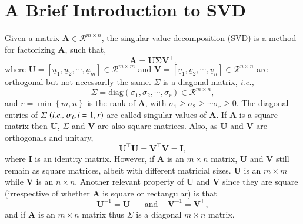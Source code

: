 \documentclass[preprint,12pt]{elsarticle}
\newcommand{\ie}{{\it i.e., }}
\begin{document}
\section{\\A Brief Introduction to SVD}\label{subsection:svd_brief}
Given a matrix $\mathbf{A}\in\mathcal{R}^{m\times n}$, the singular value decomposition (SVD) is a method for factorizing $\mathbf{A}$, such that,
\begin{equation}
  \mathbf{A} = \mathbf{U}\mathbf{\Sigma}\mathbf{V}^{\intercal}.
\end{equation}
where $\mathbf{U}=\left[\underline{u}_{1},\underline{u}_{2},\cdots,\underline{u}_{m}\right]\in\mathcal{R}^{m\times m}$ and $\mathbf{V}=\left[\underline{v}_{1},\underline{v}_{2},\cdots,\underline{v}_{n}\right]\in\mathcal{R}^{n\times n}$ are orthogonal but not necessarily the same. $\Sigma$ is a diagonal matrix, \ie
\begin{displaymath}
  \Sigma=\text{diag}\left(\sigma_{1},\sigma_{2},\cdots,\sigma_{r}\right)\in\mathcal{R}^{m\times n},
\end{displaymath}
and $r=\min\left\{m,n\right\}$ is the rank of $\mathbf{A}$, with $\sigma_{1}\ge\sigma_{2}\ge\cdots\sigma_{r}\ge 0$. The diagonal entries of $\Sigma$ $\left(\text{\ie} \sigma_{i}, i=1,r\right)$ are called singular values of $\mathbf{A}$. If $\mathbf{A}$ is a square matrix then $\mathbf{U}$, $\Sigma$ and $\mathbf{V}$ are also square matrices. Also, as $\mathbf{U}$ and $\mathbf{V}$ are orthogonals and unitary, 
\begin{equation}
  \mathbf{U}^{\intercal}\mathbf{U} = \mathbf{V}^{\intercal}\mathbf{V} = \mathbf{I},
\end{equation}
where $\mathbf{I}$ is an identity matrix. However, if $\mathbf{A}$ is an $m\times n$ matrix, $\mathbf{U}$ and $\mathbf{V}$ still remain as square matrices, albeit with different matricial sizes. $\mathbf{U}$ is an $m\times m$ while $\mathbf{V}$ is an $n\times n$. Another relevant property of $\mathbf{U}$ and $\mathbf{V}$ since they are square (irrespective of whether $\mathbf{A}$ is square or rectangular) is that
\begin{equation}
  \mathbf{U}^{-1} = \mathbf{U}^{\intercal} \;\;\;\text{ and }\;\;\; \mathbf{V}^{-1} = \mathbf{V}^{\intercal},
\end{equation}
and if $\mathbf{A}$ is an $m \times n$ matrix thus $\Sigma$ is a diagonal $m \times n$ matrix.
\end{document}

